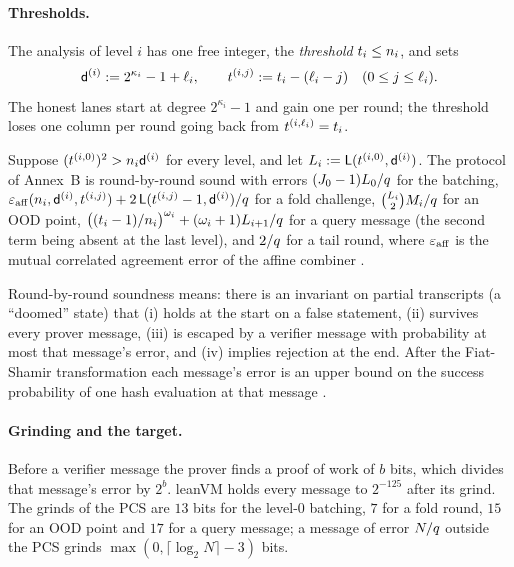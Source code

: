 \paragraph{Thresholds.} The analysis of level $i$ has one free integer, the \emph{threshold} $t_i\le n_i$, and sets
\[
\mathsf{d}^{(i)}:=2^{\kappa_i}-1+\ell_i,\qquad t^{(i,j)}:=t_i-(\ell_i-j)\quad(0\le j\le\ell_i).
\]
The honest lanes start at degree $2^{\kappa_i}-1$ and gain one per round; the threshold loses one column per round going back from $t^{(i,\ell_i)}=t_i$.

\begin{theorem}\label{thm:annexb}
Suppose $(t^{(i,0)})^2>n_i\mathsf{d}^{(i)}$ for every level, and let $L_i:=\mathsf{L}(t^{(i,0)},\mathsf{d}^{(i)})$. The protocol of Annex~B is round-by-round sound with errors $(J_0-1)L_0/q$ for the batching, $\varepsilon_{\mathrm{aff}}(n_i,\mathsf{d}^{(i)},t^{(i,j)})+2\,\mathsf{L}(t^{(i,j)}-1,\mathsf{d}^{(i)})/q$ for a fold challenge, $\binom{L_i}{2}M_i/q$ for an OOD point, $\bigl((t_i-1)/n_i\bigr)^{\omega_i}+(\omega_i+1)L_{i+1}/q$ for a query message (the second term being absent at the last level), and $2/q$ for a tail round, where $\varepsilon_{\mathrm{aff}}$ is the mutual correlated agreement error of the affine combiner \cite[Thm.~4.10]{CWYZ26}.
\end{theorem}

Round-by-round soundness \cite{CCHLRR19,ACFY25} means: there is an invariant on partial transcripts (a ``doomed'' state) that (i) holds at the start on a false statement, (ii) survives every prover message, (iii) is escaped by a verifier message with probability at most that message's error, and (iv) implies rejection at the end. After the Fiat-Shamir transformation each message's error is an upper bound on the success probability of one hash evaluation at that message \cite{CCHLRR19,BCS16}.

\paragraph{Grinding and the target.} Before a verifier message the prover finds a proof of work of $b$ bits, which divides that message's error by $2^b$. leanVM holds every message to $2^{-125}$ after its grind. The grinds of the PCS are $13$ bits for the level-$0$ batching, $7$ for a fold round, $15$ for an OOD point and $17$ for a query message; a message of error $N/q$ outside the PCS grinds $\max(0,\lceil\log_2N\rceil-3)$ bits.

